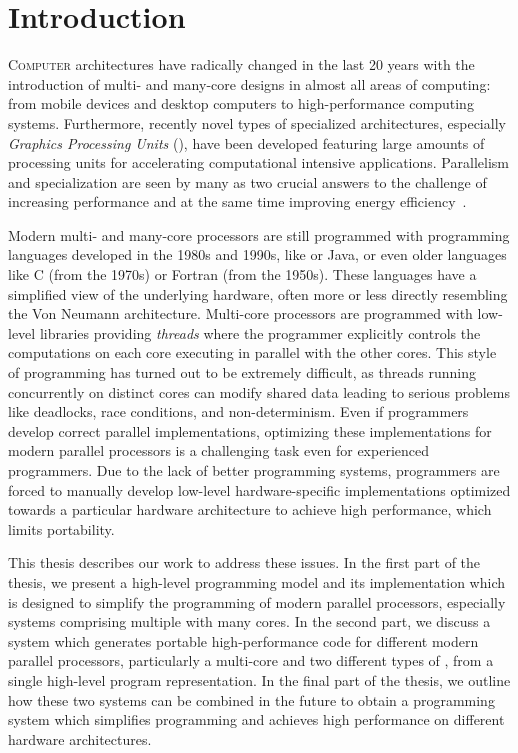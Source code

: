 
\chapter{Introduction} %

\label{ch:introduction} %

\lettrine[lines=3, loversize=0.1]{C}{omputer} architectures have radically changed in the last 20 years with the introduction of multi- and many-core designs in almost all areas of computing:
from mobile devices and desktop computers to high-performance computing systems.
Furthermore, recently novel types of specialized architectures, especially \emph{Graphics Processing Units} (\GPUs), have been developed featuring large amounts of processing units for accelerating computational intensive applications.
Parallelism and specialization are seen by many as two crucial answers to the challenge of increasing performance and at the same time improving energy efficiency~\cite{OlukotunH05,GarlandK10}.

Modern multi- and many-core processors are still programmed with programming languages developed in the 1980s and 1990s, like \Cpp or Java, or even older languages like C (from the 1970s) or Fortran (from the 1950s).
These languages have a simplified view of the underlying hardware, often more or less directly resembling the Von Neumann architecture.
Multi-core processors are programmed with low-level libraries providing \emph{threads} where the programmer explicitly controls the computations on each core executing in parallel with the other cores.
This style of programming has turned out to be extremely difficult, as threads running concurrently on distinct cores can modify shared data leading to serious problems like deadlocks, race conditions, and non-determinism.
Even if programmers develop correct parallel implementations, optimizing these implementations for modern parallel processors is a challenging task even for experienced programmers.
Due to the lack of better programming systems, programmers are forced to manually develop low-level hardware-specific implementations optimized towards a particular hardware architecture to achieve high performance, which limits portability.

This thesis describes our work to address these issues.
In the first part of the thesis, we present a high-level programming model and its implementation which is designed to simplify the programming of modern parallel processors, especially systems comprising multiple \GPUs with many cores.
In the second part, we discuss a system which generates portable high-performance code for different modern parallel processors, particularly a multi-core \CPU and two different types of \GPUs, from a single high-level program representation.
In the final part of the thesis, we outline how these two systems can be combined in the future to obtain a programming system which simplifies programming and achieves high performance on different hardware architectures.

